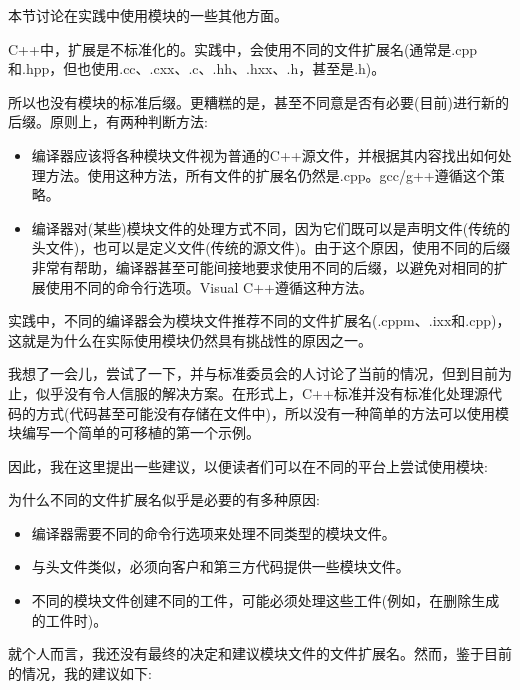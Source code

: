 

本节讨论在实践中使用模块的一些其他方面。



C++中，扩展是不标准化的。实践中，会使用不同的文件扩展名(通常是.cpp和.hpp，但也使用.cc、.cxx、.c、.hh、.hxx、.h，甚至是.h)。

所以也没有模块的标准后缀。更糟糕的是，甚至不同意是否有必要(目前)进行新的后缀。原则上，有两种判断方法:

\begin{itemize}
\item
编译器应该将各种模块文件视为普通的C++源文件，并根据其内容找出如何处理方法。使用这种方法，所有文件的扩展名仍然是.cpp。gcc/g++遵循这个策略。

\item
编译器对(某些)模块文件的处理方式不同，因为它们既可以是声明文件(传统的头文件)，也可以是定义文件(传统的源文件)。由于这个原因，使用不同的后缀非常有帮助，编译器甚至可能间接地要求使用不同的后缀，以避免对相同的扩展使用不同的命令行选项。Visual C++遵循这种方法。
\end{itemize}

实践中，不同的编译器会为模块文件推荐不同的文件扩展名(.cppm、.ixx和.cpp)，这就是为什么在实际使用模块仍然具有挑战性的原因之一。

我想了一会儿，尝试了一下，并与标准委员会的人讨论了当前的情况，但到目前为止，似乎没有令人信服的解决方案。在形式上，C++标准并没有标准化处理源代码的方式(代码甚至可能没有存储在文件中)，所以没有一种简单的方法可以使用模块编写一个简单的可移植的第一个示例。

因此，我在这里提出一些建议，以便读者们可以在不同的平台上尝试使用模块:

为什么不同的文件扩展名似乎是必要的有多种原因:

\begin{itemize}
\item
编译器需要不同的命令行选项来处理不同类型的模块文件。

\item
与头文件类似，必须向客户和第三方代码提供一些模块文件。

\item
不同的模块文件创建不同的工件，可能必须处理这些工件(例如，在删除生成的工件时)。
\end{itemize}

就个人而言，我还没有最终的决定和建议模块文件的文件扩展名。然而，鉴于目前的情况，我的建议如下:

